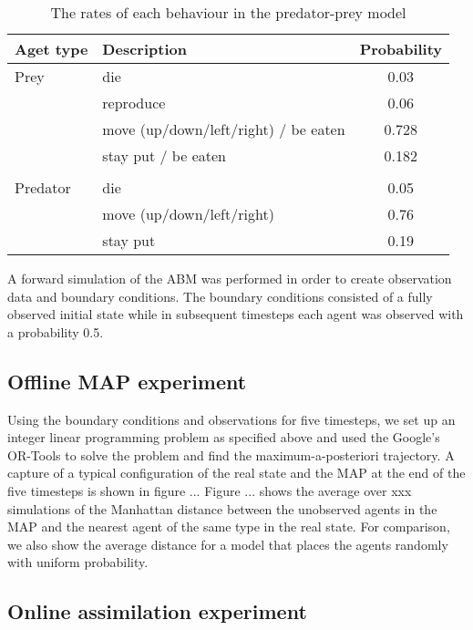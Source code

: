 \documentclass{article}
\begin{document}
\begin{table}
\begin{center}
\begin{tabular}{llc}
\hline
Aget type & Description & Probability\\
\hline
Prey & die &        0.03\\
 & reproduce &        0.06\\
 & move (up/down/left/right) / be eaten &        0.728\\
 & stay put / be eaten &  0.182 \\
 &&\\
Predator & die  &      0.05\\
 & move (up/down/left/right)&        0.76\\
 & stay put & 0.19\\
\hline
\end{tabular}
\end{center}
\caption{The rates of each behaviour in the predator-prey model}
\label{rates}
\end{table}



A forward simulation of the ABM was performed in order to create observation data and boundary conditions. The boundary conditions consisted of a fully observed initial state while in subsequent timesteps each agent was observed with a probability 0.5.

\subsection{Offline MAP experiment}

Using the boundary conditions and observations for five timesteps, we set up an integer linear programming problem as specified above and used the Google's OR-Tools\cite{googleortools} to solve the problem and find the maximum-a-posteriori trajectory. A capture of a typical configuration of the real state and the MAP at the end of the five timesteps is shown in figure ... Figure ... shows the average over xxx simulations of the Manhattan distance between the unobserved agents in the MAP and the nearest agent of the same type in the real state. For comparison, we also show the average distance for a model that places the agents randomly with uniform probability.

\subsection{Online assimilation experiment}
\end{document}
